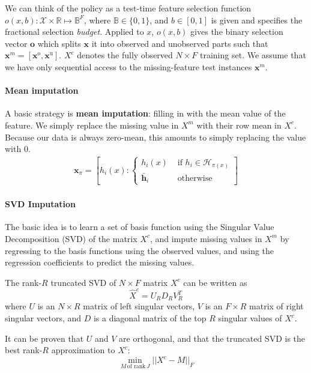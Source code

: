 We can think of the policy as a test-time feature selection function $o(x, b): \mathcal{X} \times \mathbb{R} \mapsto \mathbb{B}^F$, where $\mathbb{B} \in \{0, 1\}$, and $b \in [0, 1]$ is given and specifies the fractional selection \emph{budget}.
Applied to $x$, $o(x, b)$ gives the binary selection vector $\mathbf{o}$ which splits $\mathbf{x}$ it into observed and unobserved parts such that $\mathbf{x}^m = [\mathbf{x}^\text{o}, \mathbf{x}^\text{u}]$.
$X^c$ denotes the fully observed $N \times F$ training set.
We assume that we have only sequential access to the missing-feature test instances $\mathbf{x}^m$.

\paragraph{Mean imputation}
A basic strategy is \textbf{mean imputation}: filling in with the mean value of the feature.
We simply replace the missing value in $X^m$ with their row mean in $X^c$.
Because our data is always zero-mean, this amounts to simply replacing the value with $0$.
\begin{align}
\mathbf{x}_\pi = \left[ h_i(x) : \left\{ \begin{array}{rl}
 h_i(x) &\mbox{ if $h_i \in \mathcal{H}_{\pi(x)}$} \\
 \bar{\mathbf{h}}_i &\mbox{ otherwise}
\end{array} \right. \right]
\end{align}

\paragraph{SVD Imputation}
The basic idea is to learn a set of basis function using the Singular Value Decomposition (SVD) of the matrix $X^c$, and impute missing values in $X^m$ by regressing to the basis functions using the observed values, and using the regression coefficients to predict the missing values.

The rank-$R$ truncated SVD of $N \times F$ matrix $X^c$ can be written as
\begin{equation}
\hat{X}^c = U_R D_R V_R^T
\end{equation}
where $U$ is an $N \times R$ matrix of left singular vectors, $V$ is an $F \times R$ matrix of right singular vectors, and $D$ is a diagonal matrix of the top $R$ singular values of $X^c$.

It can be proven \cite{Hopcroft-book-2013} that $U$ and $V$ are orthogonal, and that the truncated SVD is the best rank-$R$ approximation to $X^c$:
\begin{equation}
\min_{M\,\text{of rank}\,J} || X^c - M ||_F
\end{equation}


